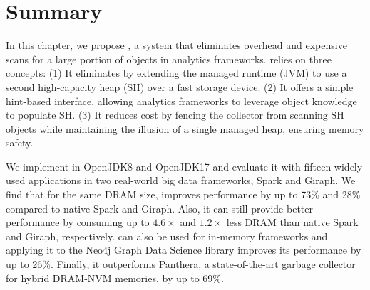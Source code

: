 \section{Summary}
In this chapter, we propose \teraheapName{}, a system that eliminates \teraheapSD overhead and expensive \teraheapGC scans for a large portion of objects in analytics frameworks.
\teraheapName{} relies on three concepts: (1) It eliminates \teraheapSD by extending the managed runtime (JVM) to use a second high-capacity heap (SH) over a fast storage device.
(2) It offers a simple hint-based interface, allowing analytics frameworks to leverage object knowledge to populate SH.
(3) It reduces \teraheapGC cost by fencing the collector from scanning SH objects while maintaining the illusion of a single managed heap, ensuring memory safety.

We implement \teraheapName{} in OpenJDK8 and OpenJDK17 and evaluate it with fifteen widely used applications in two real-world big data frameworks, Spark and Giraph.
We find that for the same DRAM size, \teraheapName{} improves performance by up to 73\% and 28\% compared to native Spark and Giraph.
Also, it can still provide better performance by consuming up to $4.6\times$ and $1.2\times$ less DRAM than native Spark and Giraph, respectively.
\teraheapName{} can also be used for in-memory frameworks and applying it to the Neo4j Graph Data Science library improves its performance by up to 26\%.
Finally, it outperforms Panthera, a state-of-the-art garbage collector for hybrid DRAM-NVM memories, by up to 69\%.
